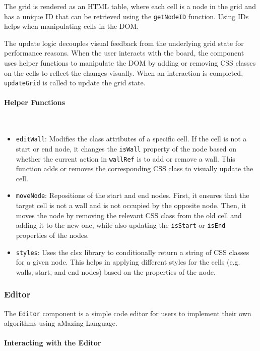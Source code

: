 The grid is rendered as an HTML table, where each cell is a node in the grid and has a unique ID that can be retrieved using the \texttt{getNodeID} function. Using IDs helps when manipulating cells in the DOM.

The update logic decouples visual feedback from the underlying grid state for performance reasons. When the user interacts with the board, the component uses helper functions to manipulate the DOM by adding or removing CSS classes on the cells to reflect the changes visually. When an interaction is completed, \texttt{updateGrid} is called to update the grid state.

\paragraph{Helper Functions} \

\begin{itemize}
    \item \texttt{editWall}: Modifies the class attributes of a specific cell. If the cell is not a start or end node, it changes the \texttt{isWall} property of the node based on whether the current action in \texttt{wallRef} is to add or remove a wall. This function adds or removes the corresponding CSS class to visually update the cell.
    \item \texttt{moveNode}: Repositions of the start and end nodes. First, it ensures that the target cell is not a wall and is not occupied by the opposite node. Then, it moves the node by removing the relevant CSS class from the old cell and adding it to the new one, while also updating the \texttt{isStart} or \texttt{isEnd} properties of the nodes.
    \item \texttt{styles}: Uses the clsx library to conditionally return a string of CSS classes for a given node. This helps in applying different styles for the cells (e.g. walls, start, and end nodes) based on the properties of the node.
\end{itemize}

\subsubsection{Editor}
The \texttt{Editor} component is a simple code editor for users to implement their own algorithms using aMazing Language.

\paragraph{Interacting with the Editor} \

